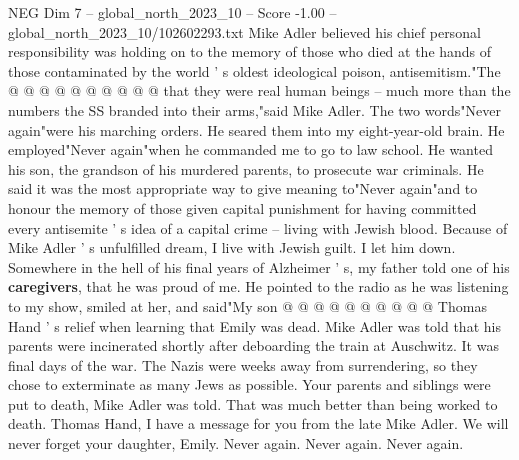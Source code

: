 \begin{textsample}{NEG Dim 7 – global\_north\_2023\_10 – Score -1.00 – global\_north\_2023\_10/102602293.txt}
Mike Adler believed his chief personal responsibility was holding on to the memory of those who died at the hands of those contaminated by the world ' s oldest ideological poison, antisemitism."The @ @ @ @ @ @ @ @ @ @ that they were real human beings -- much more than the numbers the SS branded into their arms,"said Mike Adler.
The two words"Never again"were his marching orders.
He seared them into my eight-year-old brain.
He employed"Never again"when he commanded me to go to law school.
He wanted his son, the grandson of his murdered parents, to prosecute war criminals.
He said it was the most appropriate way to give meaning to"Never again"and to honour the memory of those given capital punishment for having committed every antisemite ' s idea of a capital crime -- living with Jewish blood.
Because of Mike Adler ' s unfulfilled dream, I live with Jewish guilt.
I let him down.
Somewhere in the hell of his final years of Alzheimer ' s, my father told one of his \textbf{caregivers}, that he was proud of me.
He pointed to the radio as he was listening to my show, smiled at her, and said"My son @ @ @ @ @ @ @ @ @ @ Thomas Hand ' s relief when learning that Emily was dead.
Mike Adler was told that his parents were incinerated shortly after deboarding the train at Auschwitz.
It was final days of the war.
The Nazis were weeks away from surrendering, so they chose to exterminate as many Jews as possible.
Your parents and siblings were put to death, Mike Adler was told.
That was much better than being worked to death.
Thomas Hand, I have a message for you from the late Mike Adler.
We will never forget your daughter, Emily.
Never again.
Never again.
Never again.

\end{textsample}
